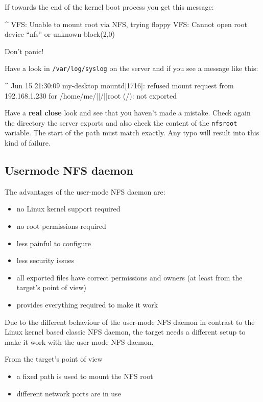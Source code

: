 If towards the end of the kernel boot process you get this message:

\begin{ptxshell}[escapechar=|]{^}
VFS:  Unable to mount root via NFS, trying floppy
VFS:  Cannot open root device “nfs” or unknown-block(2,0)
\end{ptxshell}

Don’t panic!

Have a look in \texttt{/var/log/syslog} on the server and if you see a
message like this:

\begin{ptxshell}[escapechar=|]{^}
Jun 15 21:30:09 my-desktop mountd[1716]: refused mount request from 192.168.1.230 for
/home/me/|\ptxdistBSPName |/|\ptxdistPlatformDir |root (/): not exported
\end{ptxshell}

Have a \textbf{real close} look and see that you haven’t made a mistake. Check
again the directory the server exports and also check the content of the \texttt{nfsroot}
variable. The start of the path must match exactly. Any typo will result into this
kind of failure.

\subsection{Usermode NFS daemon}					\label{sect:usermode_nfs}

The advantages of the user-mode NFS daemon are:

\begin{itemize}
	\item no Linux kernel support required
	\item no root permissions required
	\item less painful to configure
	\item less security issues
	\item all exported files have correct permissions and owners (at least from
	the target's point of view)
	\item \ptxdist{} provides everything required to make it work
\end{itemize}

Due to the different behaviour of the user-mode NFS daemon in contrast to the
Linux kernel based classic NFS daemon, the target needs a different setup to
make it work with the user-mode NFS daemon.

From the target's point of view

\begin{itemize}
	\item a fixed path is used to mount the NFS root
	\item different network ports are in use
\end{itemize}

